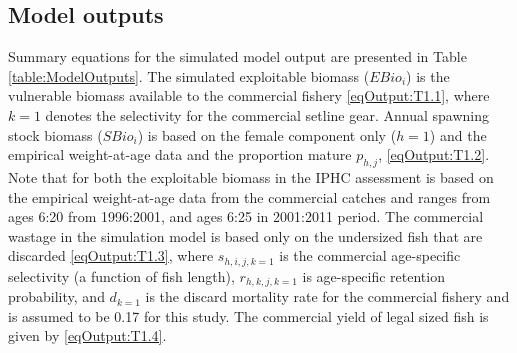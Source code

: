 \subsection{Model outputs} %
\label{sub:model_outputs}

Summary equations for the simulated model output are presented in Table \ref{table:ModelOutputs}.  The simulated exploitable biomass ($EBio_i$) is the vulnerable biomass available to the commercial fishery \eqref{eqOutput:T1.1}, where $k=1$ denotes the selectivity for the commercial setline gear.  Annual spawning stock biomass ($SBio_i$) is based on the female component only ($h=1$) and the empirical weight-at-age data and the proportion mature $p_{h,j}$, \eqref{eqOutput:T1.2}.  Note that for both the exploitable biomass  in the IPHC assessment is based on the empirical weight-at-age data from the commercial catches and ranges from ages 6:20 from 1996:2001, and ages 6:25 in 2001:2011 period.  The commercial wastage in the simulation model is based only on the undersized fish that are discarded \eqref{eqOutput:T1.3}, where $s_{h,i,j,k=1}$ is the commercial age-specific selectivity (a function of fish length), $r_{h,k,j,k=1}$ is age-specific retention probability, and $d_{k=1}$ is the discard mortality rate for the commercial fishery and is assumed to be 0.17 for this study.  The commercial yield of legal sized fish is given by \eqref{eqOutput:T1.4}.

